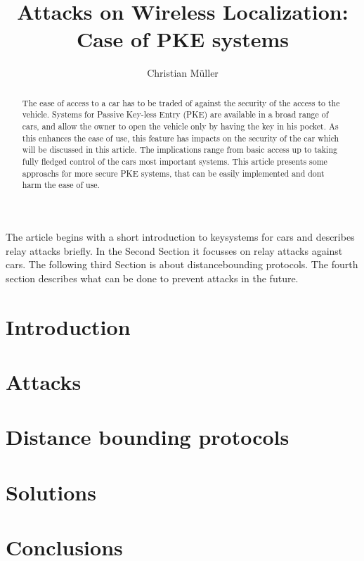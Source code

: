 \documentclass[a4paper]{IEEEtran}
\title{Attacks on Wireless Localization:\\Case of PKE systems}
\author{Christian Müller}
\begin{document}
\maketitle

\setcounter{topnumber}{1}
\setcounter{bottomnumber}{0}
\setcounter{totalnumber}{0}

\begin{abstract}
The ease of access to a car has to be traded of against the security of the
access to the vehicle.
Systems for Passive Key-less Entry (PKE) are available in a broad range of cars,
and allow the owner to open the vehicle only by having the key in his pocket.
As this enhances the ease of use, this feature has impacts on the security of
the car which will be discussed in this article. The implications range from 
basic access up to taking fully fledged control of the cars most important
systems.
This article presents some approachs for more secure PKE systems,
that can be easily implemented and dont harm the ease of use.
\end{abstract}

The article begins with a short introduction to keysystems for cars and
describes relay attacks briefly.
In the Second Section it focusses on relay attacks against cars.
The following third Section is about distancebounding protocols.
The fourth section describes what can be done to prevent attacks in the future.

\section{Introduction}
	

\section{Attacks}
	

\section{Distance bounding protocols}
	

\section{Solutions}
\label{sec:solutions}
	


\section{Conclusions}
	

\newpage
\nocite{*}


\end{document}
